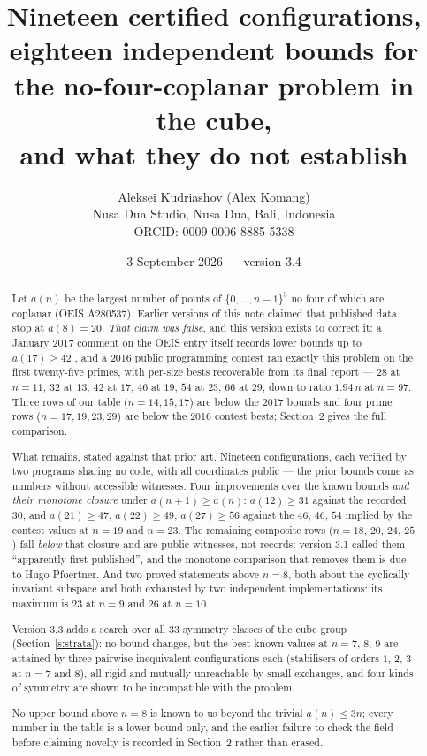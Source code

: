 \documentclass[11pt,a4paper]{article}
\title{Nineteen certified configurations, eighteen independent bounds for the no-four-coplanar problem in the cube,\\
and what they do not establish}
\author{Aleksei Kudriashov (Alex Komang)\\ \small Nusa Dua Studio, Nusa Dua, Bali, Indonesia\\ \small ORCID: 0009-0006-8885-5338}
\date{3 September 2026 --- version 3.4}
\begin{document}
\maketitle
\begin{abstract}
Let $a(n)$ be the largest number of points of $\{0,\dots,n-1\}^3$ no four of which are coplanar
(OEIS A280537).  Earlier versions of this note claimed that published data stop at $a(8)=20$.
\emph{That claim was false}, and this version exists to correct it: a January 2017 comment on
the OEIS entry itself records lower bounds up to $a(17)\ge42$ \cite{OEISA280537}, and a 2016
public programming contest ran exactly this problem on the first twenty-five primes, with
per-size bests recoverable from its final report \cite{AZsPCs} --- $28$ at $n=11$, $32$ at $13$,
$42$ at $17$, $46$ at $19$, $54$ at $23$, $66$ at $29$, down to ratio $1.94\,n$ at $n=97$.
Three rows of our table ($n=14,15,17$) are below the 2017 bounds and four prime rows
($n=17,19,23,29$) are below the 2016 contest bests; Section~2 gives the full comparison.

What remains, stated against that prior art.  Nineteen configurations, each verified by two
programs sharing no code, with all coordinates public --- the prior bounds come as numbers
without accessible witnesses.  Four improvements over the known bounds \emph{and their monotone
closure} under $a(n+1)\ge a(n)$: $a(12)\ge31$ against the recorded $30$, and $a(21)\ge47$,
$a(22)\ge49$, $a(27)\ge56$ against the $46$, $46$, $54$ implied by the contest values at $n=19$
and $n=23$.  The remaining composite rows ($n=18$, $20$, $24$, $25$) fall \emph{below} that
closure and are public witnesses, not records: version 3.1 called them ``apparently first
published'', and the monotone comparison that removes them is due to Hugo Pfoertner.  And two proved
statements above $n=8$, both about the cyclically invariant subspace and both exhausted by two
independent implementations: its maximum is $23$ at $n=9$ and $26$ at $n=10$.

Version 3.3 adds a search over all 33 symmetry classes of the cube group
(Section~\ref{s:strata}): no bound changes, but the best known values at $n=7$, $8$, $9$ are
attained by three pairwise inequivalent configurations each (stabilisers of orders $1$, $2$, $3$
at $n=7$ and $8$), all rigid and mutually unreachable by small exchanges, and four kinds of
symmetry are shown to be incompatible with the problem.

No upper bound above $n=8$ is known to us beyond the trivial $a(n)\le3n$; every number in the
table is a lower bound only, and the earlier failure to check the field before claiming novelty
is recorded in Section~2 rather than erased.
\end{abstract}
\end{document}
